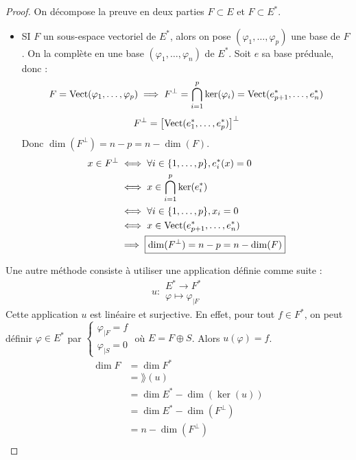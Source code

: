 \documentclass[11pt,a4paper]{report}
\begin{document}
\begin{proof}
    On décompose la preuve en deux parties $F \subset E$ et $F \subset E^*$.
    \begin{itemize}
        \item SI $F$ un sous-espace vectoriel de $E^*$, alors on pose $(\varphi_1, \dots, \varphi_p)$ une base de $F$. On la complète en une base $(\varphi_1, \dots, \varphi_n)$ de $E^*$. Soit $e$ sa base préduale, donc :
        $$ F = \mathrm{Vect}(\varphi_1, \dots, \varphi_p) \implies F^\perp = \bigcap_{i=1}^p \ker(\varphi_i) = \mathrm{Vect}(e_{p+1}^*, \dots, e_n^*)$$
        $$F^\perp = \left[ \mathrm{Vect}(e_1^*, \dots, e_p^*) \right]^\perp$$
        Donc $\dim(F^\perp) = n - p = n - \dim(F)$.
        \begin{align*}
            x \in F^\perp &\iff \forall i \in \{1, \dots, p\}, e_i^*(x) = 0 \\
            &\iff x \in \bigcap_{i=1}^p \ker(e_i^*) \\
            &\iff \forall i \in \{1, \dots, p\}, x_i = 0 \\
            &\iff x \in \mathrm{Vect}(e_{p+1}^*, \dots, e_n^*) \\
            &\implies \boxed{\dim(F^\perp) = n - p = n - \dim(F)}
        \end{align*}
    \end{itemize}

    Une autre méthode consiste à utiliser une application définie comme suite :
    $$u : \begin{matrix} E^* \longrightarrow F^* \\ \varphi \longmapsto \varphi_{|F} \end{matrix}$$
    Cette application $u$ est linéaire et surjective. En effet, pour tout $f \in F^*$, on peut définir $\varphi \in E^*$ par $\begin{cases} \varphi_{|F} = f \\ \varphi_{|S} = 0 \end{cases}$ où $E = F \oplus S$. Alors $u(\varphi) = f$.
    \begin{align*}
        \dim F &= \dim F^* \\
            &= \rang(u) \\
            &= \dim E^* - \dim(\ker(u)) \\
            &= \dim E^* - \dim(F^\perp) \\
            &= n - \dim(F^\perp) \\
    \end{align*}


\end{proof}
\end{document}
